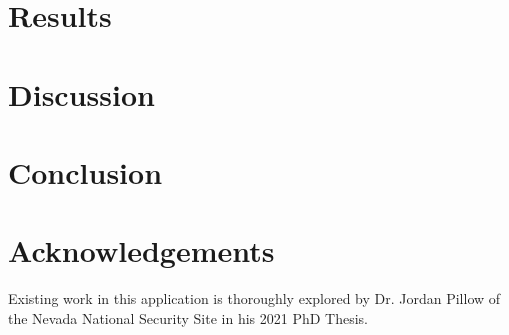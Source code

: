 \documentclass[letterpaper, 11pt, titlepage, twocolumn]{article}
\begin{document}
\section{Results}


\section{Discussion}

\section{Conclusion}

\section{Acknowledgements}
Existing work in this application is thoroughly explored by Dr. Jordan Pillow of the Nevada National Security Site in his 2021 PhD Thesis. \cite{pillow_bayesian_2021} %

\printbibliography

\end{document}
